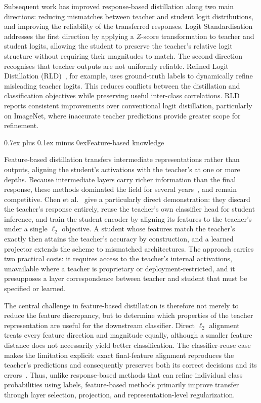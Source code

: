 \documentclass[10pt,journal,compsoc]{IEEEtran}
\makeatletter
\def\subsection{\@startsection{subsection}{2}{\z@}{-3.5ex plus -0.5ex minus -1.5ex}%
{0.7ex plus 0.1ex minus 0ex}{\normalfont\normalsize\sffamily\bfseries}}
\theoremstyle{definition}
\makeatother
\begin{document}
Subsequent work has improved response-based distillation along two main directions: reducing mismatches between teacher and student logit distributions, and improving the reliability of the transferred responses. Logit Standardisation~\cite{sun2024logit} addresses the first direction by applying a $Z$-score transformation to teacher and student logits, allowing the student to preserve the teacher's relative logit structure without requiring their magnitudes to match. The second direction recognises that teacher outputs are not uniformly reliable. Refined Logit Distillation (RLD)~\cite{sun2025knowledge}, for example, uses ground-truth labels to dynamically refine misleading teacher logits. This reduces conflicts between the distillation and classification objectives while preserving useful inter-class correlations. RLD reports consistent improvements over conventional logit distillation, particularly on ImageNet, where inaccurate teacher predictions provide greater scope for refinement.

\vspace{-5pt}
\subsection{Feature-based knowledge}
\label{sec:feature-based}

Feature-based distillation transfers intermediate representations rather than
outputs, aligning the student's activations with the teacher's at one or more
depths. Because intermediate layers carry richer information than the final
response, these methods dominated the field for several
years~\cite{chen2021review,zhao2022decoupled}, and remain competitive. Chen et
al.~\cite{chen2022reused} give a particularly direct demonstration: they discard
the teacher's response entirely, reuse the teacher's own classifier head for
student inference, and train the student encoder by aligning its features to the
teacher's under a single $\ell_2$ objective. A student whose features match the
teacher's exactly then attains the teacher's accuracy by construction, and a
learned projector extends the scheme to mismatched architectures. The approach
carries two practical costs: it requires access to the teacher's internal
activations, unavailable where a teacher is proprietary or
deployment-restricted, and it presupposes a layer
correspondence between teacher and student that must be specified or learned.

The central challenge in feature-based distillation is therefore not merely to
reduce the feature discrepancy, but to determine
which properties of the teacher representation are useful for the downstream
classifier. Direct $\ell_2$ alignment treats every feature direction and
magnitude equally, although a smaller feature distance does not necessarily
yield better classification. The
classifier-reuse case makes the limitation explicit: exact final-feature
alignment reproduces the teacher's predictions and consequently preserves both
its correct decisions and its errors~\cite{chen2022reused}. Thus, unlike
response-based methods that can refine individual class probabilities using
labels, feature-based methods primarily improve transfer through layer
selection, projection, and representation-level regularization.
\end{document}
